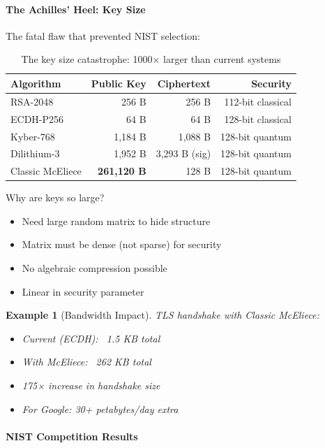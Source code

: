 \documentclass[11pt,a4paper]{article}
\newtheorem{example}{Example}
\begin{document}
\paragraph{The Achilles' Heel: Key Size}

The fatal flaw that prevented NIST selection:

\begin{table}[h]
\centering
\begin{tabular}{|l|r|r|r|}
\hline
\textbf{Algorithm} & \textbf{Public Key} & \textbf{Ciphertext} & \textbf{Security} \\
\hline
RSA-2048 & 256 B & 256 B & 112-bit classical \\
ECDH-P256 & 64 B & 64 B & 128-bit classical \\
\hline
Kyber-768 & 1,184 B & 1,088 B & 128-bit quantum \\
Dilithium-3 & 1,952 B & 3,293 B (sig) & 128-bit quantum \\
\hline
Classic McEliece & \textbf{261,120 B} & 128 B & 128-bit quantum \\
\hline
\end{tabular}
\caption{The key size catastrophe: 1000× larger than current systems}
\end{table}

Why are keys so large?
\begin{itemize}
    \item Need large random matrix to hide structure
    \item Matrix must be dense (not sparse) for security
    \item No algebraic compression possible
    \item Linear in security parameter
\end{itemize}

\begin{example}[Bandwidth Impact]
TLS handshake with Classic McEliece:
\begin{itemize}
    \item Current (ECDH): ~1.5 KB total
    \item With McEliece: ~262 KB total
    \item 175× increase in handshake size
    \item For Google: 30+ petabytes/day extra
\end{itemize}
\end{example}

\paragraph{NIST Competition Results}
\end{document}
